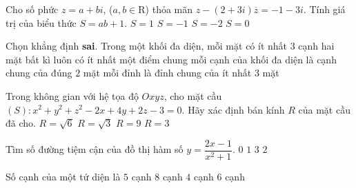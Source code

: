 \begin{ex}%
Cho số phức $z=a+bi$, ($a,b\in\mathrm{R}$) thỏa mãn $z-(2+3i)\overline{z}=-1-3i$. Tính giá trị của biểu thức $S=ab+1$.
\choice
{\True $S=1$}
{$S=-1$}
{$S=-2$}
{$S=0$}
\end{ex}

\begin{ex}%
Chọn khẳng định {\bf sai}. Trong một khối đa diện,
\choice
{mỗi mặt có ít nhất $3$ cạnh}
{\True hai mặt bất kì luôn có ít nhất một điểm chung}
{mỗi cạnh của khối đa diện là cạnh chung của đúng $2$ mặt}
{mỗi đỉnh là đỉnh chung của ít nhất $3$ mặt}
\end{ex}

\begin{ex}%
Trong không gian với hệ tọa độ $Oxyz$, cho mặt cầu $(S)\colon x^2+y^2+z^2-2x+4y+2z-3=0$. Hãy xác định bán kính $R$ của mặt cầu đã cho.
\choice
{$R=\sqrt{6}$}
{$R=\sqrt{3}$}
{$R=9$}
{\True $R=3$}
\end{ex}

\begin{ex}%
Tìm số đường tiệm cận của đồ thị hàm số $y=\dfrac{2x-1}{x^2+1}$.
\choice
{$0$}
{\True $1$}
{$3$}
{$2$}
\end{ex}

\begin{ex}%
Số cạnh của một tứ diện là 
\choice
{$5$ cạnh}
{$8$ cạnh}
{$4$ cạnh}
{\True $6$ cạnh}
\end{ex} 

